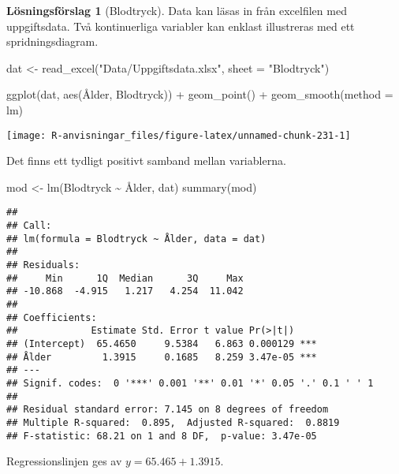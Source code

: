 \documentclass[
]{book}
\newenvironment{Shaded}{\begin{snugshade}}{\end{snugshade}}
\newcommand{\AttributeTok}[1]{\textcolor[rgb]{0.77,0.63,0.00}{#1}}
\newcommand{\FunctionTok}[1]{\textcolor[rgb]{0.00,0.00,0.00}{#1}}
\newcommand{\NormalTok}[1]{#1}
\newcommand{\OtherTok}[1]{\textcolor[rgb]{0.56,0.35,0.01}{#1}}
\newcommand{\SpecialCharTok}[1]{\textcolor[rgb]{0.00,0.00,0.00}{#1}}
\newcommand{\StringTok}[1]{\textcolor[rgb]{0.31,0.60,0.02}{#1}}
\theoremstyle{definition}
\theoremstyle{definition}
\theoremstyle{definition}
\theoremstyle{definition}
\newtheorem{hypothesis}{Lösningsförslag}[chapter]
\theoremstyle{remark}
\begin{document}
\begin{hypothesis}[Blodtryck]
Data kan läsas in från excelfilen med uppgiftsdata. Två kontinuerliga variabler kan enklast illustreras med ett spridningsdiagram.

\begin{Shaded}
\begin{Highlighting}[]
\NormalTok{dat }\OtherTok{\textless{}{-}} \FunctionTok{read\_excel}\NormalTok{(}\StringTok{"Data/Uppgiftsdata.xlsx"}\NormalTok{, }\AttributeTok{sheet =} \StringTok{"Blodtryck"}\NormalTok{)}

\FunctionTok{ggplot}\NormalTok{(dat, }\FunctionTok{aes}\NormalTok{(Ålder, Blodtryck)) }\SpecialCharTok{+}
  \FunctionTok{geom\_point}\NormalTok{() }\SpecialCharTok{+}
  \FunctionTok{geom\_smooth}\NormalTok{(}\AttributeTok{method =}\NormalTok{ lm)}
\end{Highlighting}
\end{Shaded}

\begin{center}\texttt{[image: R-anvisningar\_files/figure-latex/unnamed-chunk-231-1]} \end{center}

Det finns ett tydligt positivt samband mellan variablerna.

\begin{Shaded}
\begin{Highlighting}[]
\NormalTok{mod }\OtherTok{\textless{}{-}} \FunctionTok{lm}\NormalTok{(Blodtryck }\SpecialCharTok{\textasciitilde{}}\NormalTok{ Ålder, dat)}
\FunctionTok{summary}\NormalTok{(mod)}
\end{Highlighting}
\end{Shaded}

\begin{verbatim}
## 
## Call:
## lm(formula = Blodtryck ~ Ålder, data = dat)
## 
## Residuals:
##     Min      1Q  Median      3Q     Max 
## -10.868  -4.915   1.217   4.254  11.042 
## 
## Coefficients:
##             Estimate Std. Error t value Pr(>|t|)    
## (Intercept)  65.4650     9.5384   6.863 0.000129 ***
## Ålder         1.3915     0.1685   8.259 3.47e-05 ***
## ---
## Signif. codes:  0 '***' 0.001 '**' 0.01 '*' 0.05 '.' 0.1 ' ' 1
## 
## Residual standard error: 7.145 on 8 degrees of freedom
## Multiple R-squared:  0.895,  Adjusted R-squared:  0.8819 
## F-statistic: 68.21 on 1 and 8 DF,  p-value: 3.47e-05
\end{verbatim}

Regressionslinjen ges av \(y = 65.465 + 1.3915\).


\end{hypothesis}
\end{document}
